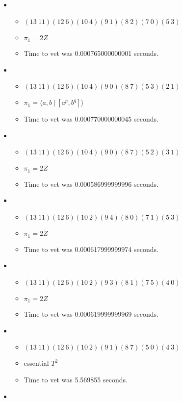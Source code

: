 \documentclass{article}
\begin{document}
\begin{itemize}
\item \begin{itemize}
      \item $(13\ 11)(12\ 6)(10\ 4)(9\ 1)(8\ 2)(7\ 0)(5\ 3)$
      \item $\pi_1 =2 Z$
      \item Time to vet was 0.000765000000001 seconds.
\end{itemize}
\item \begin{itemize}
      \item $(13\ 11)(12\ 6)(10\ 4)(9\ 0)(8\ 7)(5\ 3)(2\ 1)$
      \item $\pi_1 = \langle a,b\ |\ [a^p,b^q]\rangle$
      \item Time to vet was 0.000770000000045 seconds.
\end{itemize}
\item \begin{itemize}
      \item $(13\ 11)(12\ 6)(10\ 4)(9\ 0)(8\ 7)(5\ 2)(3\ 1)$
      \item $\pi_1 =2 Z$
      \item Time to vet was 0.000586999999996 seconds.
\end{itemize}
\item \begin{itemize}
      \item $(13\ 11)(12\ 6)(10\ 2)(9\ 4)(8\ 0)(7\ 1)(5\ 3)$
      \item $\pi_1 =2 Z$
      \item Time to vet was 0.000617999999974 seconds.
\end{itemize}
\item \begin{itemize}
      \item $(13\ 11)(12\ 6)(10\ 2)(9\ 3)(8\ 1)(7\ 5)(4\ 0)$
      \item $\pi_1 =2 Z$
      \item Time to vet was 0.000619999999969 seconds.
\end{itemize}
\item \begin{itemize}
      \item $(13\ 11)(12\ 6)(10\ 2)(9\ 1)(8\ 7)(5\ 0)(4\ 3)$
      \item essential $T^2$
      \item Time to vet was 5.569855 seconds.
\end{itemize}
\item \begin{itemize}

\end{itemize}
\end{itemize}
\end{document}
